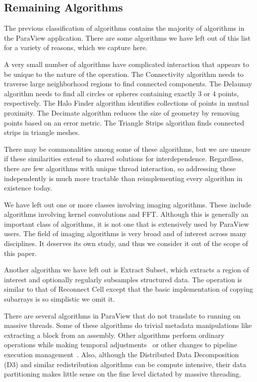 \documentclass{sig-alternate}
\newcommand*{\lcite}[1]{~\cite{#1}}
\newcommand{\algclass}[1]{\textsf{#1}}
\newcommand{\alg}[1]{#1}
\newcommand{\algorithmclasssection}[1]{\subsection*{#1}}
\begin{document}
\algorithmclasssection{Remaining Algorithms}

\noindent
The previous classification of algorithms contains the majority of
algorithms in the ParaView application. There are some algorithms we have
left out of this list for a variety of reasons, which we capture here.

A very small number of algorithms have complicated interaction that appears
to be unique to the nature of the operation. The \alg{Connectivity}
algorithm needs to traverse large neighborhood regions to find connected
components. The \alg{Delaunay} algorithm needs to find all circles or
spheres containing exactly 3 or 4 points, respectively. The \alg{Halo
  Finder} algorithm identifies collections of points in mutual
proximity. The \alg{Decimate} algorithm reduces the size of geometry by
removing points based on an error metric. The \alg{Triangle Strips}
algorithm finds connected strips in triangle meshes.

There may be commonalities among some of these algorithms, but we are
unsure if these similarities extend to shared solutions for
interdependence.  Regardless, there are few algorithms with unique thread
interaction, so addressing these independently is much more tractable than
reimplementing every algorithm in existence today.

We have left out one or more classes involving imaging algorithms. These
include algorithms involving kernel convolutions and \alg{FFT}. Although
this is generally an important class of algorithms, it is not one that is
extensively used by ParaView users. The field of imaging algorithms is very
broad and of interest across many disciplines. It deserves its own study,
and thus we consider it out of the scope of this paper.

Another algorithm we have left out is \alg{Extract Subset}, which extracts
a region of interest and optionally regularly subsamples structured
data. The operation is similar to that of \algclass{Reconnect Cell} except
that the basic implementation of copying subarrays is so simplistic we omit
it.

There are several algorithms in ParaView that do not translate to running
on massive threads. Some of these algorithms do trivial metadata
manipulations like extracting a block from an assembly. Other algorithms
perform ordinary operations while making temporal
adjustments\lcite{Biddiscombe2007} or other changes to pipeline execution
management\lcite{Moreland2013:TVCG}. Also, although the \alg{Distributed
  Data Decomposition} (\alg{D3}) and similar redistribution algorithms can
be compute intensive, their data partitioning makes little sense on the
fine level dictated by massive threading.
\end{document}
